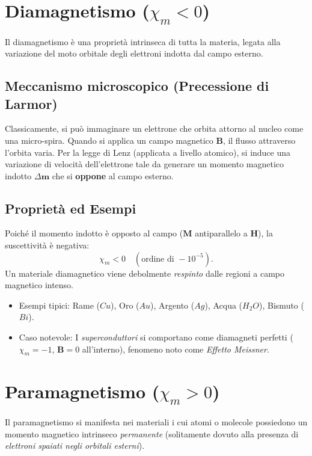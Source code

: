 \documentclass[a4paper,11pt]{report}
\begin{document}
\section{Diamagnetismo (\texorpdfstring{$\chi_m < 0$}{chi < 0})}

Il diamagnetismo è una proprietà intrinseca di tutta la materia, legata alla variazione del moto orbitale degli elettroni indotta dal campo esterno.

\subsection{Meccanismo microscopico (Precessione di Larmor)}
Classicamente, si può immaginare un elettrone che orbita attorno al nucleo come una micro-spira. Quando si applica un campo magnetico $\bm{B}$, il flusso attraverso l'orbita varia. Per la legge di Lenz (applicata a livello atomico), si induce una variazione di velocità dell'elettrone tale da generare un momento magnetico indotto $\Delta \bm{m}$ che si \textbf{oppone} al campo esterno.

\subsection{Proprietà ed Esempi}
Poiché il momento indotto è opposto al campo ($\bm{M}$ antiparallelo a $\bm{H}$), la suscettività è negativa:
\begin{equation}
    \chi_m < 0 \quad (\text{ordine di } -10^{-5}).
\end{equation}
Un materiale diamagnetico viene debolmente \textit{respinto} dalle regioni a campo magnetico intenso.
\begin{itemize}
    \item {Esempi tipici:} Rame ($Cu$), Oro ($Au$), Argento ($Ag$), Acqua ($H_2O$), Bismuto ($Bi$).
    \item {Caso notevole:} I \textit{superconduttori} si comportano come diamagneti perfetti ($\chi_m = -1$, $\bm{B}=0$ all'interno), fenomeno noto come \textit{Effetto Meissner}.
\end{itemize}

\section{Paramagnetismo (\texorpdfstring{$\chi_m > 0$}{chi > 0})}

Il paramagnetismo si manifesta nei materiali i cui atomi o molecole possiedono un momento magnetico intrinseco \textit{permanente} (solitamente dovuto alla presenza di \textit{elettroni spaiati negli orbitali esterni}).
\end{document}

